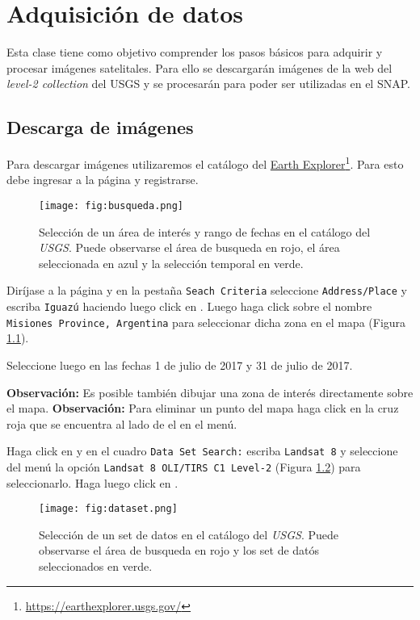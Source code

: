 \chapter{Adquisición de datos}

Esta clase tiene como objetivo comprender los pasos básicos para adquirir y procesar imágenes satelitales. Para ello se descargarán imágenes de la web del \emph{level-2 collection} del USGS y se procesarán para poder ser utilizadas en el SNAP.

\section{Descarga de imágenes}

Para descargar imágenes utilizaremos el catálogo del \href{https://earthexplorer.usgs.gov/}{Earth Explorer}\footnote{\href{https://earthexplorer.usgs.gov/}{https://earthexplorer.usgs.gov/}}. Para esto debe ingresar a la página y registrarse.

\begin{figure}[h!]
    \centering
    \texttt{[image: fig:busqueda.png]}
    \caption{Selección de un área de interés y rango de fechas en el catálogo del \emph{USGS}. Puede observarse el área de busqueda en rojo, el área seleccionada en azul y la selección temporal en verde.}
    \label{fig:busqueda}
\end{figure}

Diríjase a la página y en la pestaña \texttt{Seach Criteria} seleccione \texttt{Address/Place} y escriba \texttt{Iguazú} haciendo luego click en  . Luego haga click sobre el nombre \texttt{Misiones Province, Argentina} para seleccionar dicha zona en el mapa (Figura \ref{fig:busqueda}).

Seleccione luego en  las fechas 1 de julio de 2017 y 31 de julio de 2017.

\textbf{Observación:} Es posible también dibujar una zona de interés directamente sobre el mapa.
\textbf{Observación:} Para eliminar un punto del mapa haga click en la cruz roja que se encuentra al lado de el en el menú.

Haga click en  y en el cuadro \texttt{Data Set Search:} escriba \texttt{Landsat 8} y seleccione del menú la opción \texttt{Landsat 8 OLI/TIRS C1 Level-2} (Figura \ref{fig:dataset}) para seleccionarlo. Haga luego click en .

\begin{figure}[h!]
    \centering
    \texttt{[image: fig:dataset.png]}
    \caption{Selección de un set de datos en el catálogo del \emph{USGS}. Puede observarse el área de busqueda en rojo y los set de datós seleccionados en verde.}
    \label{fig:dataset}
\end{figure}

